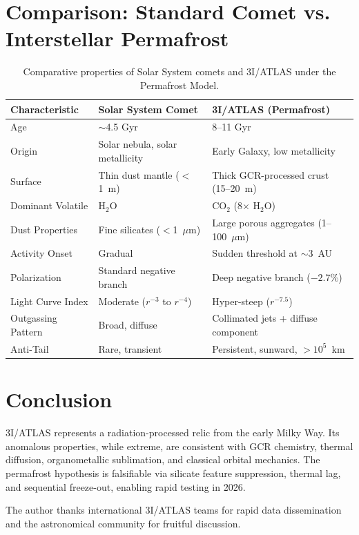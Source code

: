 \documentclass[reprint,aps,prd,noshowpacs]{revtex4-2}
\begin{document}
\section{Comparison: Standard Comet vs. Interstellar Permafrost}
\begin{table}[t]
\centering
\caption{Comparative properties of Solar System comets and 3I/ATLAS under the Permafrost Model.}
\label{tab:comparison}
\begin{tabular}{@{}lll@{}}
\toprule
Characteristic & Solar System Comet & 3I/ATLAS (Permafrost) \\
\midrule
Age & $\sim$4.5 Gyr & 8--11 Gyr \\
Origin & Solar nebula, solar metallicity & Early Galaxy, low metallicity \\
Surface & Thin dust mantle ($<$1~m) & Thick GCR-processed crust (15--20~m) \\
Dominant Volatile & H$_2$O & CO$_2$ (8$\times$ H$_2$O) \\
Dust Properties & Fine silicates ($<$1~$\mu$m) & Large porous aggregates (1--100~$\mu$m) \\
Activity Onset & Gradual & Sudden threshold at $\sim$3~AU \\
Polarization & Standard negative branch & Deep negative branch ($-2.7\%$) \\
Light Curve Index & Moderate ($r^{-3}$ to $r^{-4}$) & Hyper-steep ($r^{-7.5}$) \\
Outgassing Pattern & Broad, diffuse & Collimated jets + diffuse component \\
Anti-Tail & Rare, transient & Persistent, sunward, $>10^5$~km \\
\bottomrule
\end{tabular}
\end{table}

\section{Conclusion}
3I/ATLAS represents a radiation-processed relic from the early Milky Way. Its anomalous properties, while extreme, are consistent with GCR chemistry, thermal diffusion, organometallic sublimation, and classical orbital mechanics. The permafrost hypothesis is falsifiable via silicate feature suppression, thermal lag, and sequential freeze-out, enabling rapid testing in 2026.

\begin{acknowledgments}
The author thanks international 3I/ATLAS teams for rapid data dissemination and the astronomical community for fruitful discussion.
\end{acknowledgments}

% 

\end{document}
